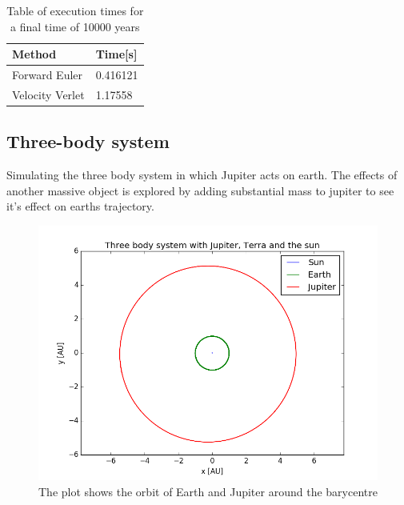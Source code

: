 \begin{table}
\centering
\caption{Table of execution times for a final time of 10000 years}
\begin{tabular}{|l|l|}
\hline
\textbf{Method}  & \textbf{Time[s]} \\
\hline
Forward Euler   & 0.416121 \\
\hline
Velocity Verlet & 1.17558 \\
\hline
\end{tabular}
\end{table}

\subsection{Three-body system}
Simulating the three body system in which Jupiter acts on earth. The effects of another massive object is explored by adding substantial mass to jupiter to see it's effect on earths trajectory.
 
\begin{figure}[h]
\includegraphics[scale=0.7]{figures/three_body}
\caption{The plot shows the orbit of Earth and Jupiter around the barycentre }\label{fig:three}
\end{figure}

